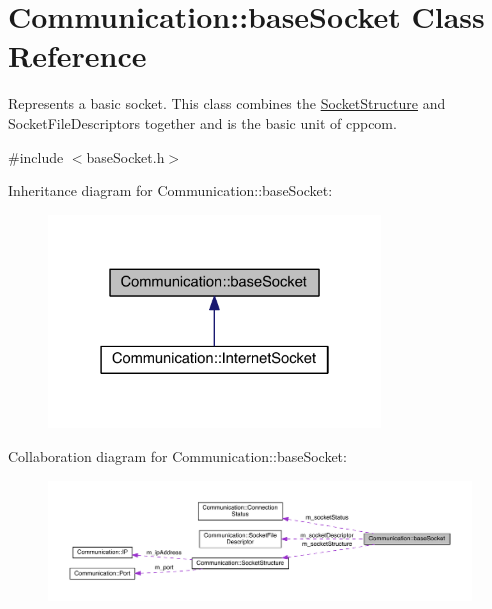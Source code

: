 \hypertarget{class_communication_1_1base_socket}{}\section{Communication\+:\+:base\+Socket Class Reference}
\label{class_communication_1_1base_socket}


Represents a basic socket. This class combines the \hyperlink{class_communication_1_1_socket_structure}{Socket\+Structure} and Socket\+File\+Descriptors together and is the basic unit of cppcom.  




{\ttfamily \#include $<$base\+Socket.\+h$>$}



Inheritance diagram for Communication\+:\+:base\+Socket\+:\nopagebreak
\begin{figure}[H]
\begin{center}
\leavevmode
\includegraphics[width=250pt]{class_communication_1_1base_socket__inherit__graph}
\end{center}
\end{figure}


Collaboration diagram for Communication\+:\+:base\+Socket\+:\nopagebreak
\begin{figure}[H]
\begin{center}
\leavevmode
\includegraphics[width=350pt]{class_communication_1_1base_socket__coll__graph}
\end{center}
\end{figure}
